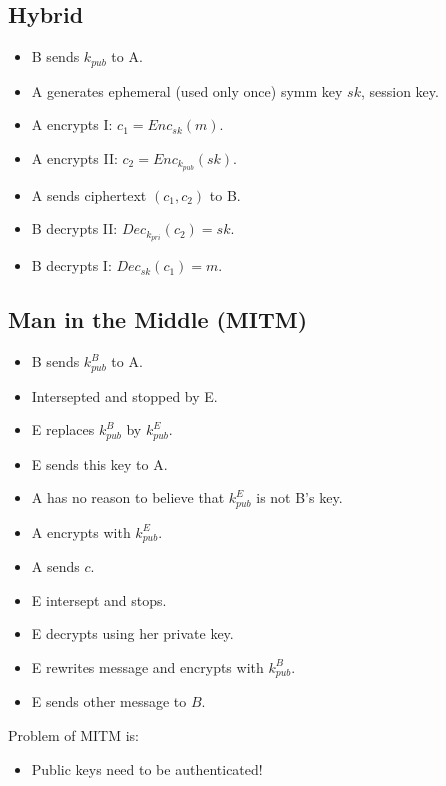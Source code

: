 \documentclass[language=english,number=]{homework}
\begin{document}
    \subsection{Hybrid}

    \begin{itemize}
        \item B sends $k_{pub}$ to A.
        \item A generates ephemeral (used only once) symm key $sk$, session key.
        \item A encrypts I: $c_1 = Enc_{sk}(m)$.
        \item A encrypts II: $c_2 = Enc_{k_{pub}}(sk)$.
        \item A sends ciphertext $(c_1, c_2)$ to B.
        \item B decrypts II: $Dec_{k_{pri}}(c_2) = sk$.
        \item B decrypts I: $Dec_{sk}(c_1) = m$.
    \end{itemize}

    \subsection{Man in the Middle (MITM)}

    \begin{itemize}
        \item B sends $k_{pub}^{B}$ to A.
        \item Intersepted and stopped by E.
        \item E replaces $k_{pub}^{B}$ by $k_{pub}^{E}$.
        \item E sends this key to A.
        \item A has no reason to believe that $k_{pub}^{E}$ is not B's key.
        \item A encrypts with $k_{pub}^{E}$.
        \item A sends $c$.
        \item E intersept and stops.
        \item E decrypts using her private key.
        \item E rewrites message and encrypts with $k_{pub}^{B}$.
        \item E sends other message to $B$.
    \end{itemize}

    Problem of MITM is:
    \begin{itemize}
        \item Public keys need to be authenticated!
    \end{itemize}
\end{document}
